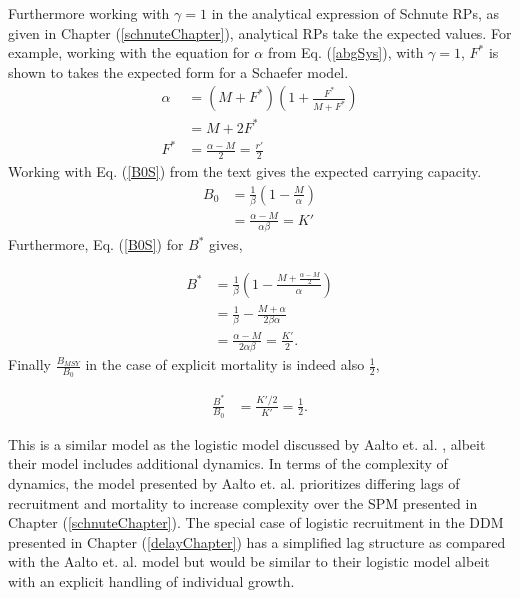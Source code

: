 %
Furthermore working with $\gamma=1$ in the analytical expression of Schnute RPs, 
as given in Chapter (\ref{schnuteChapter}), analytical RPs take the expected 
values. For example, working with the equation for $\alpha$ from Eq. (\ref{abgSys}), 
with $\gamma=1$, $F^*$ is shown to takes the expected form for a Schaefer model.
\begin{align}
\alpha &= (M+F^*)\left(1+\frac{F^*}{M+F^*}\right) \nonumber\\
       &= M+2F^* \nonumber\\
   F^* &= \frac{\alpha-M}{2} = \frac{r'}{2} 
\end{align}
Working with Eq. (\ref{B0S}) from the text gives the expected carrying capacity.
\begin{align}
B_0 &= \frac{1}{\beta} \left( 1-\frac{M}{\alpha} \right) \nonumber\\
    &= \frac{\alpha-M}{\alpha\beta} = K'
\end{align}
Furthermore, Eq. (\ref{B0S}) for $B^*$ gives,

\begin{align}
    B^* &= \frac{1}{\beta} \left( 1-\frac{M+\frac{\alpha-M}{2}}{\alpha}\right) \nonumber\\
        &= \frac{1}{\beta} - \frac{M+\alpha}{2\beta\alpha}\nonumber\\
        &= \frac{\alpha-M}{2\alpha\beta} = \frac{K'}{2}.
\end{align}
%
Finally $\frac{B_{MSY}}{B_0}$ in the case of explicit mortality is indeed also $\frac{1}{2}$,

\begin{align}
\frac{B^*}{B_0}&=\frac{K'/2}{K'}=\frac{1}{2}.
\end{align}

%
This is a similar model as the logistic model discussed by Aalto et. al. \cite{aalto_separating_2015}, 
albeit their model includes additional dynamics. In terms of the complexity of 
dynamics, the model presented by Aalto et. al. prioritizes differing lags of 
recruitment and mortality to increase complexity over the SPM presented in Chapter (\ref{schnuteChapter}). 
The special case of logistic recruitment in the DDM presented in Chapter (\ref{delayChapter}) 
has a simplified lag structure as compared with the Aalto et. al. model but would be similar 
to their logistic model albeit with an explicit handling of individual growth. 
%
%
